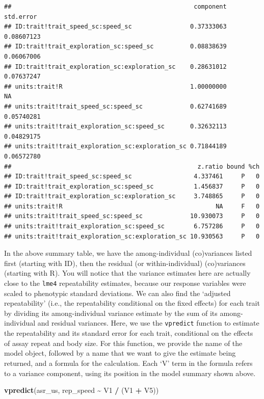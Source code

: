 \documentclass[
  12pt,
]{book}
\newenvironment{Shaded}{\begin{snugshade}}{\end{snugshade}}
\newcommand{\KeywordTok}[1]{\textcolor[rgb]{0.13,0.29,0.53}{\textbf{#1}}}
\newcommand{\NormalTok}[1]{#1}
\newcommand{\OperatorTok}[1]{\textcolor[rgb]{0.81,0.36,0.00}{\textbf{#1}}}
\newcommand{\StringTok}[1]{\textcolor[rgb]{0.31,0.60,0.02}{#1}}
\begin{document}
\begin{verbatim}
##                                                  component  std.error
## ID:trait!trait_speed_sc:speed_sc                0.37333063 0.08607123
## ID:trait!trait_exploration_sc:speed_sc          0.08838639 0.06067006
## ID:trait!trait_exploration_sc:exploration_sc    0.28631012 0.07637247
## units:trait!R                                   1.00000000         NA
## units:trait!trait_speed_sc:speed_sc             0.62741689 0.05740281
## units:trait!trait_exploration_sc:speed_sc       0.32632113 0.04829175
## units:trait!trait_exploration_sc:exploration_sc 0.71844189 0.06572780
##                                                   z.ratio bound %ch
## ID:trait!trait_speed_sc:speed_sc                 4.337461     P   0
## ID:trait!trait_exploration_sc:speed_sc           1.456837     P   0
## ID:trait!trait_exploration_sc:exploration_sc     3.748865     P   0
## units:trait!R                                          NA     F   0
## units:trait!trait_speed_sc:speed_sc             10.930073     P   0
## units:trait!trait_exploration_sc:speed_sc        6.757286     P   0
## units:trait!trait_exploration_sc:exploration_sc 10.930563     P   0
\end{verbatim}

In the above summary table, we have the among-individual (co)variances listed first (starting with ID), then the residual (or within-individual) (co)variances (starting with R). You will notice that the variance estimates here are actually close to the \texttt{lme4} repeatability estimates, because our response variables were scaled to phenotypic standard deviations. We can also find the `adjusted repeatability' (i.e., the repeatability conditional on the fixed effects) for each trait by dividing its among-individual variance estimate by the sum
of its among-individual and residual variances.
Here, we use the \texttt{vpredict} function to estimate the repeatability and its
standard error for each trait, conditional on the effects of assay repeat and body size.
For this function, we provide the name of the model object, followed by a name that we want to give the estimate being returned, and a formula for the calculation. Each `V' term in the formula refers to a variance component, using its position in the model summary shown above.

\begin{Shaded}
\begin{Highlighting}[]
\KeywordTok{vpredict}\NormalTok{(asr\_us, rep\_speed }\OperatorTok{\textasciitilde{}}\StringTok{ }\NormalTok{V1 }\OperatorTok{/}\StringTok{ }\NormalTok{(V1 }\OperatorTok{+}\StringTok{ }\NormalTok{V5))}
\end{Highlighting}
\end{Shaded}
\end{document}
